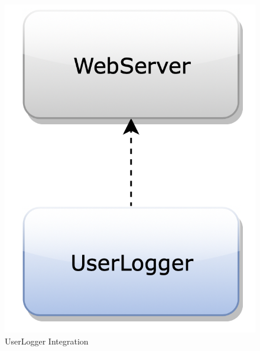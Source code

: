 \begin{figure}[H]
\begin{center}
        \begin{minipage}[c]{.40\textwidth}
	\centering
\includegraphics[scale=0.35]{Images/IntegrationPlanImages/fig7.png}
\caption{UserLogger Integration}
        \end{minipage}%
        \hspace{10mm}%
        \begin{minipage}[c]{.40\textwidth}
	\centering

\end{minipage}
\end{center}
\end{figure}
